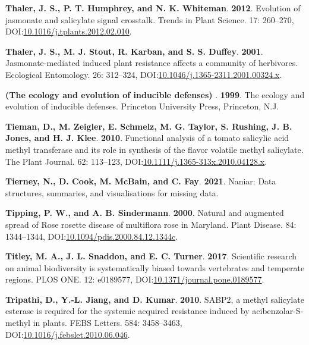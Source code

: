 \documentclass[12pt,final,CPage]{ufthesis}
\newlength{\cslhangindent}
\newenvironment{CSLReferences}[2] %
{%
	\setlength{\parindent}{0pt}
	\ifodd #1 \everypar{\setlength{\hangindent}{\cslhangindent}}\ignorespaces\fi
	\ifnum #2 > 0
	\setlength{\parskip}{#2\baselineskip}
	\fi
}%
{}
\begin{document}
{\begin{CSLReferences}{1}{0}
  \leavevmode{}%
  \textbf{Thaler, J. S., P. T. Humphrey, and N. K. Whiteman}. \textbf{2012}. Evolution of jasmonate and salicylate signal crosstalk. Trends in Plant Science. 17: 260--270, DOI:\href{https://doi.org/10.1016/j.tplants.2012.02.010}{10.1016/j.tplants.2012.02.010}.

  \leavevmode{}%
  \textbf{Thaler, J. S., M. J. Stout, R. Karban, and S. S. Duffey}. \textbf{2001}. Jasmonate-mediated induced plant resistance affects a community of herbivores. Ecological Entomology. 26: 312--324, DOI:\href{https://doi.org/10.1046/j.1365-2311.2001.00324.x}{10.1046/j.1365-2311.2001.00324.x}.

  \leavevmode{}%
  \textbf{(The ecology and evolution of inducible defenses) }. \textbf{1999}. The ecology and evolution of inducible defenses. Princeton University Press, Princeton, N.J.

  \leavevmode{}%
  \textbf{Tieman, D., M. Zeigler, E. Schmelz, M. G. Taylor, S. Rushing, J. B. Jones, and H. J. Klee}. \textbf{2010}. Functional analysis of a tomato salicylic acid methyl transferase and its role in synthesis of the flavor volatile methyl salicylate. The Plant Journal. 62: 113--123, DOI:\href{https://doi.org/10.1111/j.1365-313x.2010.04128.x}{10.1111/j.1365-313x.2010.04128.x}.

  \leavevmode{}%
  \textbf{Tierney, N., D. Cook, M. McBain, and C. Fay}. \textbf{2021}. Naniar: Data structures, summaries, and visualisations for missing data.

  \leavevmode{}%
  \textbf{Tipping, P. W., and A. B. Sindermann}. \textbf{2000}. Natural and augmented spread of {Rose rosette disease} of multiflora rose in {Maryland}. Plant Disease. 84: 1344--1344, DOI:\href{https://doi.org/10.1094/pdis.2000.84.12.1344c}{10.1094/pdis.2000.84.12.1344c}.

  \leavevmode{}%
  \textbf{Titley, M. A., J. L. Snaddon, and E. C. Turner}. \textbf{2017}. Scientific research on animal biodiversity is systematically biased towards vertebrates and temperate regions. {PLOS} {ONE}. 12: e0189577, DOI:\href{https://doi.org/10.1371/journal.pone.0189577}{10.1371/journal.pone.0189577}.

  \leavevmode{}%
  \textbf{Tripathi, D., Y.-L. Jiang, and D. Kumar}. \textbf{2010}. {SABP}2, a methyl salicylate esterase is required for the systemic acquired resistance induced by acibenzolar-{S}-methyl in plants. {FEBS} Letters. 584: 3458--3463, DOI:\href{https://doi.org/10.1016/j.febslet.2010.06.046}{10.1016/j.febslet.2010.06.046}.


\end{CSLReferences}}
\end{document}
